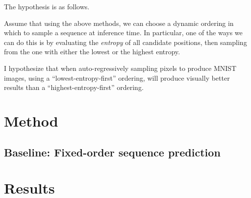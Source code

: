 The hypothesis is as follows.

Assume that using the above methods, we can choose a dynamic ordering in which to sample a sequence at inference time. In particular, one of the ways we can do this is by evaluating the \textit{entropy} of all candidate positions, then sampling from the one with either the lowest or the highest entropy.

I hypothesize that when auto-regressively sampling pixels to produce MNIST images, using a ``lowest-entropy-first'' ordering, will produce visually better results than a ``highest-entropy-first'' ordering.

\section{Method}

\subsection{}

\subsection{Baseline: Fixed-order sequence prediction}



\section{Results}
